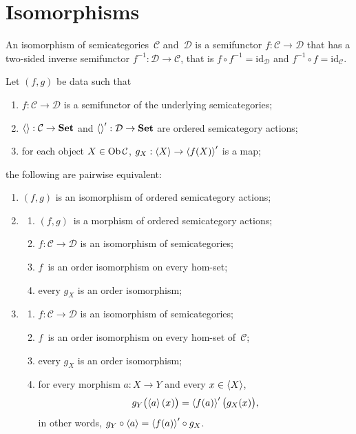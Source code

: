 \section{Isomorphisms}

\begin{obvious}
An isomorphism of semicategories~$\mathcal{C}$ and~$\mathcal{D}$ is a semifunctor $f:\mathcal{C}\to\mathcal{D}$ that has a two-sided inverse semifunctor $f^{-1}:\mathcal{D}\to\mathcal{C}$, that is $f\circ f^{-1}=\mathrm{id}_{\mathcal{D}}$ and $f^{-1}\circ f=\mathrm{id}_{\mathcal{C}}$.
\end{obvious}

\begin{prop}
Let $(f,g)$ be data such that
\begin{enumerate}
\item $f:\mathcal{C}\to\mathcal{D}$ is a semifunctor of the underlying semicategories;
\item ${\left\langle \right\rangle}:\mathcal{C}\to\mathbf{Set}$ and ${\left\langle \right\rangle}':\mathcal{D}\to\mathbf{Set}$ are ordered semicategory actions;
\item for each object $X\in\operatorname{Ob}\mathcal{C}$, $g_X:\left\langle X\right\rangle\to \left\langle f(X)\right\rangle'$ is a map;
\end{enumerate}
the following are pairwise equivalent:
\begin{enumerate}
\item $(f,g)$ is an isomorphism of ordered semicategory actions;
\item
\begin{enumerate}
\item $(f,g)$~is a morphism of ordered semicategory actions;
\item $f:\mathcal{C}\to\mathcal{D}$ is an isomorphism of semicategories;
\item $f$~is an order isomorphism on every hom-set;
\item every $g_X$ is an
order isomorphism;
\end{enumerate}
\item
\begin{enumerate}
\item $f:\mathcal{C}\to\mathcal{D}$ is an isomorphism of semicategories;
\item $f$~is an order isomorphism on every hom-set of~$\mathcal{C}$;
\item every $g_X$ is an
order isomorphism;
\item for every morphism $a:X\to Y$ and every $x\in\left\langle X\right\rangle$,
\[
g_Y\bigl(\left\langle a\right\rangle(x)\bigr)
 =\left\langle f(a)\right\rangle'\bigl(g_X(x)\bigr),
\]
in other words, $g_Y\circ\left\langle a\right\rangle=\left\langle f(a)\right\rangle'\circ g_X$.
\end{enumerate}
\end{enumerate}
\end{prop}

